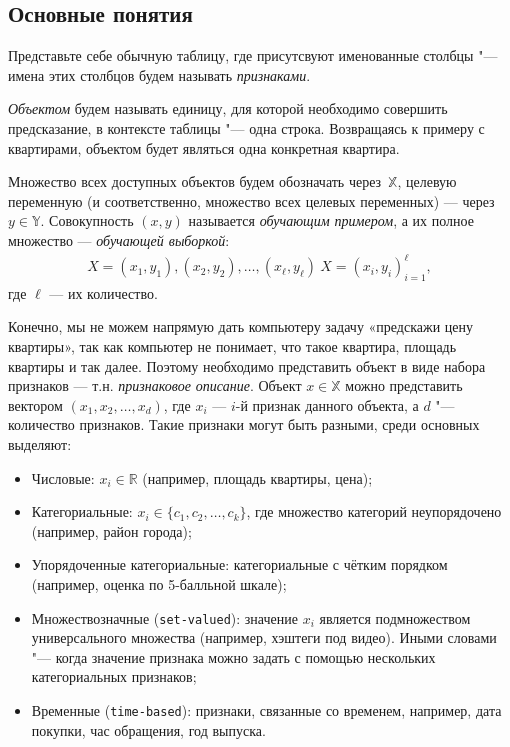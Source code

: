 \subsection*{Основные понятия}

Представьте себе обычную таблицу, где присутсвуют именованные столбцы "--- имена этих столбцов будем называть \textit{признаками}.

\textit{Объектом} будем называть единицу, для которой необходимо совершить предсказание, в контексте таблицы "--- одна строка. Возвращаясь к примеру с квартирами, объектом будет являться одна конкретная квартира. 

Множество всех доступных объектов будем обозначать через~$\mathbb{X}$, целевую переменную (и соответственно, множество всех целевых переменных) — через~$y \in \mathbb{Y}$. Совокупность $(x, y)$ называется \textit{обучающим примером}, а их полное множество — \textit{обучающей выборкой}:
\begin{gather*}
X = {(x_1, y_1), (x_2, y_2), \dots, (x_\ell, y_\ell)} \
X = {(x_i, y_i)}_{i=1}^\ell,
\end{gather*}
где $\ell$ — их количество.

Конечно, мы не можем напрямую дать компьютеру задачу «предскажи цену квартиры», так как компьютер не понимает, что такое квартира, площадь квартиры и так далее. Поэтому необходимо представить объект в виде набора признаков — т.н. \textit{признаковое описание}. Объект $x \in \mathbb{X}$ можно представить вектором $(x_1, x_2, \dots, x_d)$, где $x_i$ — $i$-й признак данного объекта, а $d$ "--- количество признаков. Такие признаки могут быть разными, среди основных выделяют:

\begin{itemize}
\item Числовые: $x_i \in \mathbb{R}$ (например, площадь квартиры, цена);
\item Категориальные: $x_i \in \{c_1, c_2, \dots, c_k\}$, где множество категорий неупорядочено (например, район города);
\item Упорядоченные категориальные: категориальные с чётким порядком (например, оценка по 5-балльной шкале);
\item Множествозначные (\texttt{set-valued}): значение $x_i$ является подмножеством универсального множества (например, хэштеги под видео). Иными словами "--- когда значение признака можно задать с помощью нескольких категориальных признаков;
\item Временные (\texttt{time-based}): признаки, связанные со временем, например, дата покупки, час обращения, год выпуска.
\end{itemize}

